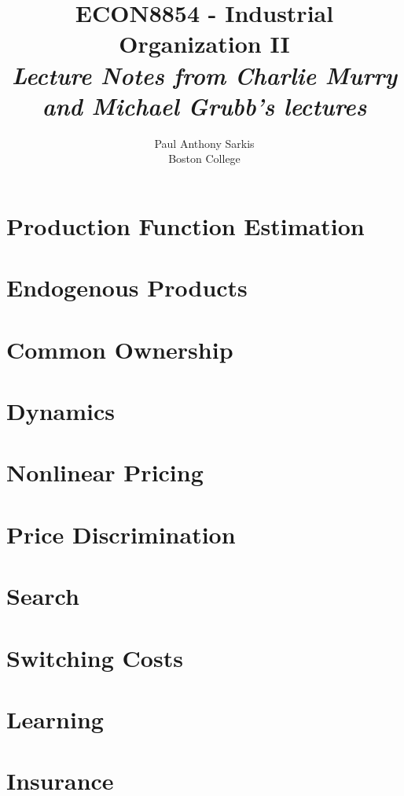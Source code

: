\documentclass[12pt]{report}
\begin{document}
\date{}
\title{\textbf{\huge{ECON8854 - Industrial Organization II}}\\ \textit{Lecture Notes from Charlie Murry and Michael Grubb's lectures}}
\author{Paul Anthony Sarkis\\ Boston College} 
 
\maketitle

\tableofcontents

\setlength{\parskip}{1em}%


\chapter{Production Function Estimation}


\chapter{Endogenous Products}


\chapter{Common Ownership}


\chapter{Dynamics}


\chapter{Nonlinear Pricing}


\chapter{Price Discrimination}


\chapter{Search}


\chapter{Switching Costs}


\chapter{Learning}


\chapter{Insurance}

\end{document}

